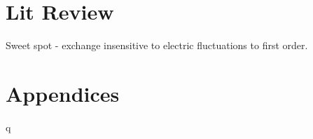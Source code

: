 \documentclass[12pt]{article}
\begin{document}
\section{Lit Review}
Sweet spot - exchange insensitive to electric fluctuations to first order.


\cite{daniel_lec_2016}

\cite{sun_hee_development_2011}

\cite{hill_exchange-based_2021}





\section{Appendices}



q
\end{document}
